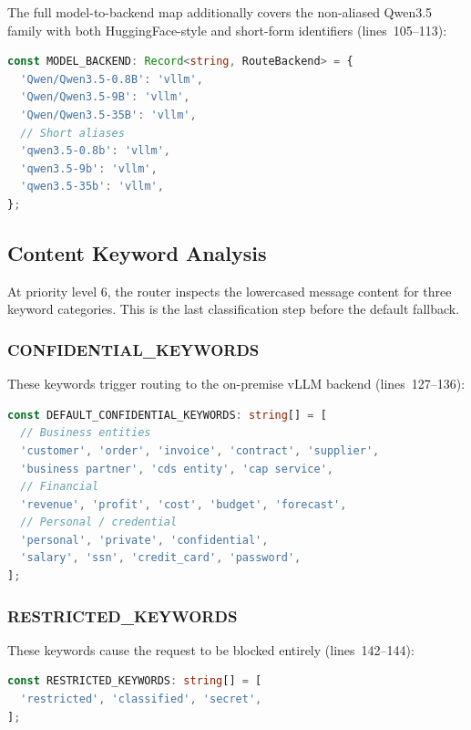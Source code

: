 \documentclass[11pt]{article}
\begin{document}
The full model-to-backend map additionally covers the non-aliased Qwen3.5
family with both HuggingFace-style and short-form identifiers (lines~105--113):

\begin{lstlisting}[language=TypeScript,caption={MODEL\_BACKEND map (intent-router.ts, lines 105--113)},firstnumber=105]
const MODEL_BACKEND: Record<string, RouteBackend> = {
  'Qwen/Qwen3.5-0.8B': 'vllm',
  'Qwen/Qwen3.5-9B': 'vllm',
  'Qwen/Qwen3.5-35B': 'vllm',
  // Short aliases
  'qwen3.5-0.8b': 'vllm',
  'qwen3.5-9b': 'vllm',
  'qwen3.5-35b': 'vllm',
};
\end{lstlisting}

\subsection{Content Keyword Analysis}

At priority level 6, the router inspects the lowercased message content for
three keyword categories. This is the last classification step before the
default fallback.

\subsubsection{CONFIDENTIAL\_KEYWORDS}

These keywords trigger routing to the on-premise vLLM backend
(lines~127--136):

\begin{lstlisting}[language=TypeScript,caption={DEFAULT\_CONFIDENTIAL\_KEYWORDS (intent-router.ts, lines 127--136)},firstnumber=127]
const DEFAULT_CONFIDENTIAL_KEYWORDS: string[] = [
  // Business entities
  'customer', 'order', 'invoice', 'contract', 'supplier',
  'business partner', 'cds entity', 'cap service',
  // Financial
  'revenue', 'profit', 'cost', 'budget', 'forecast',
  // Personal / credential
  'personal', 'private', 'confidential',
  'salary', 'ssn', 'credit_card', 'password',
];
\end{lstlisting}

\subsubsection{RESTRICTED\_KEYWORDS}

These keywords cause the request to be blocked entirely (lines~142--144):

\begin{lstlisting}[language=TypeScript,caption={RESTRICTED\_KEYWORDS (intent-router.ts, lines 142--144)},firstnumber=142]
const RESTRICTED_KEYWORDS: string[] = [
  'restricted', 'classified', 'secret',
];
\end{lstlisting}
\end{document}
